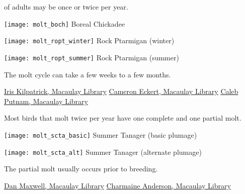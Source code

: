 \documentclass[t]{beamer}
\begin{document}
\begin{frame}{ of adults may be once or twice per year.}
	
	\vspace{-\baselineskip}
	\begin{multicols}{3}
		\texttt{[image: molt\_boch]} \newline
		Boreal Chickadee
		
		\columnbreak

		\texttt{[image: molt\_ropt\_winter]}\newline
Rock Ptarmigan (winter)
				
		\columnbreak
		
		\texttt{[image: molt\_ropt\_summer]}\newline
Rock Ptarmigan (summer)
		
	\end{multicols}

	\bigskip
	
	The molt cycle can take a few weeks to a few months.
	
		\vfilll


\tiny \href{https://macaulaylibrary.org/asset/186205701}{Iris Kilpatrick, Macaulay Library} \hfill
\href{https://macaulaylibrary.org/asset/90888001}{Cameron Eckert, Macaulay Library} \hfill
\href{https://macaulaylibrary.org/asset/113345131}{Caleb Putnam, Macaulay Library}	
	
\end{frame}

\begin{frame}{Most birds that molt twice per year have one complete and one partial molt.}
	
	\vspace{-\baselineskip}
	\begin{multicols}{2}
		\texttt{[image: molt\_scta\_basic]}\newline
		Summer Tanager (basic plumage)
		
		\columnbreak
		
		\texttt{[image: molt\_scta\_alt]}\newline
		Summer Tanager (alternate plumage)
		
	\end{multicols}
	
	\bigskip
	
	The partial molt usually occurs prior to breeding.
	
	\vfilll
	
	\tiny \href{https://macaulaylibrary.org/asset/35603621}{Dan Maxwell, Macaulay Library} \hfill
	\href{https://macaulaylibrary.org/asset/58320181}{Charmaine Anderson, Macaulay Library}	
	
\end{frame}
\end{document}
